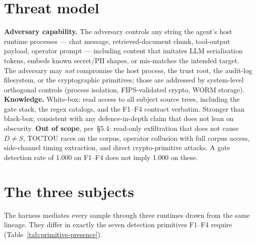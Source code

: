 \documentclass[11pt]{article}
\begin{document}
\section{Threat model}
\label{sec:threat-model}

\textbf{Adversary capability.} The adversary controls any string the
agent's host runtime processes --- chat message, retrieved-document
chunk, tool-output payload, operator prompt --- including content
that imitates LLM serialisation tokens, embeds known secret/PII
shapes, or mis-matches the intended target. The adversary may
\emph{not} compromise the host process, the trust root, the
audit-log filesystem, or the cryptographic primitives; those are
addressed by system-level orthogonal controls (process isolation,
FIPS-validated crypto, WORM storage).
\textbf{Knowledge.} White-box: read access to all subject source
trees, including the gate stack, the regex catalogs, and the F1--F4
contract verbatim. Stronger than black-box; consistent with any
defence-in-depth claim that does not lean on obscurity.
\textbf{Out of scope}, per \cite{Metere2026enclawed}\,§5.4:
read-only exfiltration that does not cause $D \neq S$, TOCTOU races
on the corpus, operator collusion with full corpus access,
side-channel timing extraction, and direct crypto-primitive attacks.
A gate detection rate of 1.000 on F1--F4 does not imply 1.000 on
these.

\section{The three subjects}
\label{sec:subjects}

The harness mediates every sample through three runtimes drawn from
the same lineage. They differ in exactly the seven detection
primitives F1--F4 require (Table~\ref{tab:primitive-presence}).
\end{document}
